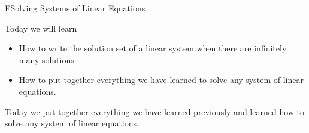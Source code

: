 \begin{module}{E}{Solving Systems of Linear Equations}
\newModuleSection
\begin{goals}
Today we will learn
\begin{itemize}
\item How to write the solution set of a linear system when there are infinitely many solutions
\item How to put together everything we have learned to solve any system of linear equations.
\end{itemize}
\end{goals}
\begin{summary}
Today we put together everything we have learned previously and learned how to solve any system of linear equations.
\end{summary}



\end{module}
